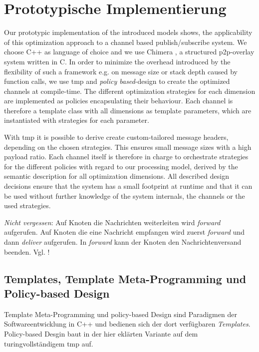 \chapter{Prototypische Implementierung}
\label{chap:impl}

Our prototypic implementation of the introduced models shows, the applicability of this optimization approach to a channel based publish/subscribe system. We choose C++ as language of choice and we use Chimera \cite{Allen2006Chimera}, a structured p2p-overlay system written in C. In order to minimize the overhead introduced by the flexibility of such a framework e.g. on message size or stack depth caused by function calls, we use \ac{tmp} and \emph{policy based}-design \cite{Alexandrescu2001Modern} to create the optimized channels at compile-time. The different optimization strategies for each dimension are implemented as policies encapsulating their behaviour. Each channel is therefore a template class with all dimensions as template parameters, which are instantiated with strategies for each parameter.  

With \ac{tmp} it is possible to derive create custom-tailored message headers, depending on the chosen strategies. This ensures small message sizes with a high payload ratio. Each channel itself is therefore in charge to orchestrate strategies for the different policies with regard to our processing model, derived by the semantic description for all optimization dimensions. All described design decisions ensure that the system has a small footprint at runtime and that it can be used without further knowledge of the system internals, the channels or the used strategies.

\emph{Nicht vergessen}: Auf Knoten die Nachrichten weiterleiten wird \emph{forward} aufgerufen. Auf Knoten die eine Nachricht empfangen wird zuerst \emph{forward} und dann \emph{deliver} aufgerufen. In \emph{forward} kann der Knoten den Nachrichtenversand beenden. Vgl. !

\section{Templates, Template Meta-Programming und Policy-based Design}
Template Meta-Programming und policy-based Design \cite{Alexandrescu2001Modern} sind Paradigmen der Softwareentwicklung in C++ und bedienen sich der dort verfügbaren \emph{Templates}. Policy-based Desgin baut in der hier eklärten Variante auf dem turingvollständigem \ac{tmp} auf.


